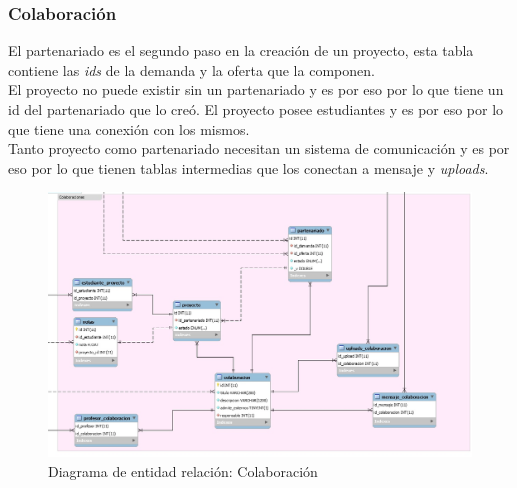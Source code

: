 \documentclass[11pt]{article}
\begin{document}
\subsubsection{Colaboración}
El partenariado es el segundo paso en la creación de un proyecto, esta tabla contiene las \textit{ids} de la demanda y la oferta que la componen.\\
El proyecto no puede existir sin un partenariado y es por eso por lo que tiene un id del partenariado que lo creó. El proyecto posee estudiantes y es por eso por lo que tiene una conexión con los mismos.\\
Tanto proyecto como partenariado necesitan un sistema de comunicación y es por eso por lo que tienen tablas intermedias que los conectan a mensaje y \textit{uploads}.
\begin{figure}
	\centering
	\includegraphics[scale=0.4]{colaboracion}
	\caption{Diagrama de entidad relación: Colaboración}
\end{figure}
\end{document}
